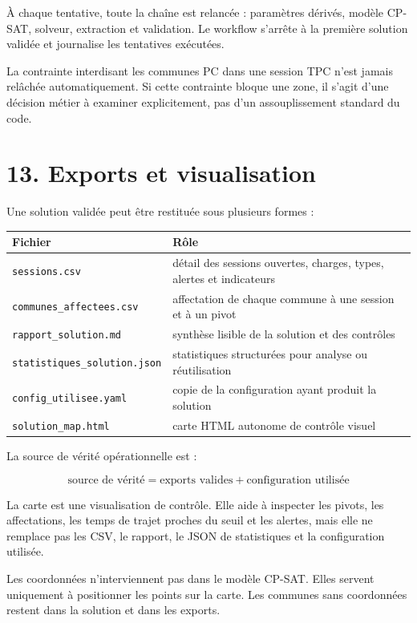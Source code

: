 \documentclass[11pt,a4paper]{article}
\begin{document}
À chaque tentative, toute la chaîne est relancée : paramètres dérivés, modèle CP-SAT, solveur, extraction et validation. Le workflow s'arrête à la première solution validée et journalise les tentatives exécutées.

La contrainte interdisant les communes PC dans une session TPC n'est jamais relâchée automatiquement. Si cette contrainte bloque une zone, il s'agit d'une décision métier à examiner explicitement, pas d'un assouplissement standard du code.

\section{13. Exports et visualisation}

Une solution validée peut être restituée sous plusieurs formes :

\begin{longtable}{|L{0.34\textwidth}|L{0.56\textwidth}|}
\hline
Fichier & Rôle \\
\hline
\endhead
\texttt{sessions.csv} & détail des sessions ouvertes, charges, types, alertes et indicateurs \\
\hline
\texttt{communes\_affectees.csv} & affectation de chaque commune à une session et à un pivot \\
\hline
\texttt{rapport\_solution.md} & synthèse lisible de la solution et des contrôles \\
\hline
\texttt{statistiques\_solution.json} & statistiques structurées pour analyse ou réutilisation \\
\hline
\texttt{config\_utilisee.yaml} & copie de la configuration ayant produit la solution \\
\hline
\texttt{solution\_map.html} & carte HTML autonome de contrôle visuel \\
\hline
\end{longtable}

La source de vérité opérationnelle est :

\[
\text{source de vérité}
=
\text{exports valides}
+
\text{configuration utilisée}
\]

La carte est une visualisation de contrôle. Elle aide à inspecter les pivots, les affectations, les temps de trajet proches du seuil et les alertes, mais elle ne remplace pas les CSV, le rapport, le JSON de statistiques et la configuration utilisée.

Les coordonnées n'interviennent pas dans le modèle CP-SAT. Elles servent uniquement à positionner les points sur la carte. Les communes sans coordonnées restent dans la solution et dans les exports.
\end{document}
